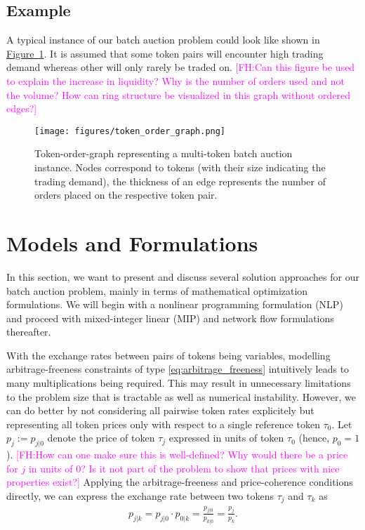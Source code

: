 \documentclass[11pt,parskip=full]{scrartcl}%
\newcommand*{\figref}[1]{\hyperref[{#1}]{Figure~\ref*{#1}}}
\newcommand{\FH}[1]{\textcolor{magenta}{[FH:#1]}}
\begin{document}
\subsection{Example}
\label{subsec:example}

A typical instance of our batch auction problem could look like shown in
\figref{fig:order-token-graph}.
It is assumed that some token pairs will encounter high trading demand whereas other will only
rarely be traded on.
\FH{Can this figure be used to explain the increase in liquidity? Why is the number of orders used and not the volume? How can ring structure be visualized in this graph without ordered edges?}

\begin{figure}[h!]
  \centering
  \texttt{[image: figures/token\_order\_graph.png]}
  \caption{Token-order-graph representing a multi-token batch auction instance. Nodes correspond
  to tokens (with their size indicating the trading demand), the thickness of an edge represents
  the number of orders placed on the respective token pair.}
  \label{fig:order-token-graph}
\end{figure}

\clearpage
\section{Models and Formulations}
\label{sec:models}

In this section, we want to present and discuss several solution approaches for our batch auction
problem, mainly in terms of mathematical optimization formulations.
We will begin with a nonlinear programming formulation (NLP) and proceed with mixed-integer linear
(MIP) and network flow formulations thereafter.

With the exchange rates between pairs of tokens being variables, modelling arbitrage-freeness
constraints of type \eqref{eq:arbitrage_freeness} intuitively leads to many multiplications being
required.
This may result in unnecessary limitations to the problem size that is tractable as well as
numerical instability.
However, we can do better by not considering all pairwise token rates explicitely but representing
all token prices only with respect to a single reference token $ \tau_0 $.
Let $ p_j := p_{j|0} $ denote the price of token $ \tau_j $ expressed in units of token $ \tau_0 $
(hence, $ p_0 = 1 $).
\FH{How can one make sure this is well-defined? Why would there be a price for $j$ in units of $0$? Is it not part of the problem to show that prices with nice properties exist?}
Applying the arbitrage-freeness and price-coherence conditions directly, we can express the
exchange rate between two tokens $ \tau_j $ and $ \tau_k $ as
\begin{align}
  p_{j|k} = p_{j|0} \cdot p_{0|k} = \frac{p_{j|0}}{p_{k|0}} = \frac{p_j}{p_k}.
\end{align}
\end{document}
